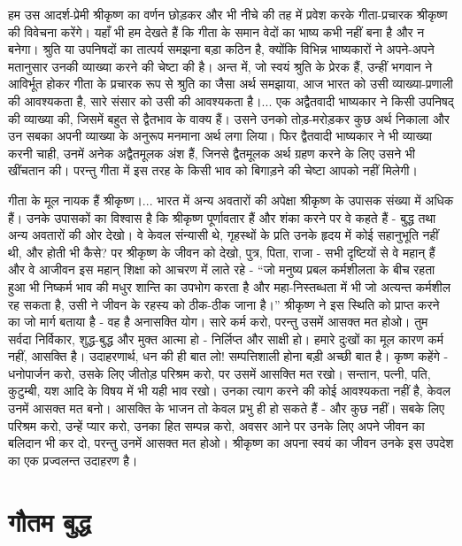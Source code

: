 हम उस आदर्श-प्रेमी श्रीकृष्ण का वर्णन छोड़कर और भी नीचे की तह में प्रवेश करके गीता-प्रचारक श्रीकृष्ण की विवेचना करेंगे। यहाँ भी हम देखते हैं कि गीता के समान वेदों का भाष्य कभी नहीं बना है और न बनेगा। श्रुति या उपनिषदों का तात्पर्य समझना बड़ा कठिन है, क्योंकि विभिन्न भाष्यकारों ने अपने-अपने मतानुसार उनकी व्याख्या करने की चेष्टा की है। अन्त में, जो स्वयं श्रुति के प्रेरक हैं, उन्हीं भगवान ने आविर्भूत होकर गीता के प्रचारक रूप से श्रुति का जैसा अर्थ समझाया, आज भारत को उसी व्याख्या-प्रणाली की आवश्यकता है, सारे संसार को उसी की आवश्यकता है।... एक अद्वैतवादी भाष्यकार ने किसी उपनिषद् की व्याख्या की, जिसमें बहुत से द्वैतभाव के वाक्य हैं। उसने उनको तोड़-मरोड़कर कुछ अर्थ निकाला और उन सबका अपनी व्याख्या के अनुरूप मनमाना अर्थ लगा लिया। फिर द्वैतवादी भाष्यकार ने भी व्याख्या करनी चाही, उनमें अनेक अद्वैतमूलक अंश हैं, जिनसे द्वैतमूलक अर्थ ग्रहण करने के लिए उसने भी खींचतान की। परन्तु गीता में इस तरह के किसी भाव को बिगाड़ने की चेष्टा आपको नहीं मिलेगी। 

गीता के मूल नायक हैं श्रीकृष्ण।... भारत में अन्य अवतारों की अपेक्षा श्रीकृष्ण के उपासक संख्या में अधिक हैं। उनके उपासकों का विश्वास है कि श्रीकृष्ण पूर्णावतार हैं और शंका करने पर वे कहते हैं - बुद्ध तथा अन्य अवतारों की ओर देखो। वे केवल संन्यासी थे, गृहस्थों के प्रति उनके हृदय में कोई सहानुभूति नहीं थी, और होती भी कैसे? पर श्रीकृष्ण के जीवन को देखो, पुत्र, पिता, राजा - सभी दृष्टियों से वे महान् हैं और वे आजीवन इस महान् शिक्षा को आचरण में लाते रहे - “जो मनुष्य प्रबल कर्मशीलता के बीच रहता हुआ भी निष्कर्म भाव की मधुर शान्ति का उपभोग करता है और महा-निस्तब्धता में भी जो अत्यन्त कर्मशील रह सकता है, उसी ने जीवन के रहस्य को ठीक-ठीक जाना है।” श्रीकृष्ण ने इस स्थिति को प्राप्त करने का जो मार्ग बताया है - वह है अनासक्ति योग। सारे कर्म करो, परन्तु उसमें आसक्त मत होओ। तुम सर्वदा निर्विकार, शुद्ध-बुद्ध और मुक्त आत्मा हो - निर्लिप्त और साक्षी हो। हमारे दुःखों का मूल कारण कर्म नहीं, आसक्ति है। उदाहरणार्थ, धन की ही बात लो! सम्पत्तिशाली होना बड़ी अच्छी बात है। कृष्ण कहेंगे - धनोपार्जन करो, उसके लिए जीतोड़ परिश्रम करो, पर उसमें आसक्ति मत रखो। सन्तान, पत्नी, पति, कुटुम्बी, यश आदि के विषय में भी यही भाव रखो। उनका त्याग करने की कोई आवश्यकता नहीं है, केवल उनमें आसक्त मत बनो। आसक्ति के भाजन तो केवल प्रभु ही हो सकते हैं - और कुछ नहीं। सबके लिए परिश्रम करो, उन्हें प्यार करो, उनका हित सम्पन्न करो, अवसर आने पर उनके लिए अपने जीवन का बलिदान भी कर दो, परन्तु उनमें आसक्त मत होओ। श्रीकृष्ण का अपना स्वयं का जीवन उनके इस उपदेश का एक प्रज्वलन्त उदाहरण है।


\section*{गौतम बुद्ध}


